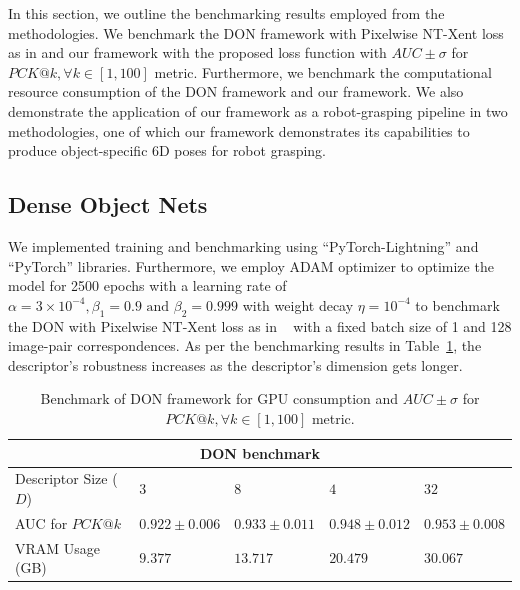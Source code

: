 In this section, we outline the benchmarking results employed from the methodologies.
We benchmark the DON framework with Pixelwise NT-Xent loss as in \cite{adrian2022efficient} and our framework with the
proposed loss function with $AUC \pm \sigma$ for $PCK@k, \forall k \in [1, 100]$ metric.
Furthermore, we benchmark the computational resource consumption of the DON framework and our framework.
We also demonstrate the application of our framework as a robot-grasping pipeline in two methodologies,
one of which our framework demonstrates its capabilities to produce object-specific 6D poses for robot grasping.

\subsection{Dense Object Nets}
We implemented training and benchmarking using ``PyTorch-Lightning''\cite{falcon2019pytorch} and ``PyTorch''\cite{paszke2019pytorch} libraries.
Furthermore, we employ
ADAM\cite{kingma2014adam} optimizer to optimize the model for 2500 epochs with a learning rate of
$\alpha = 3 \times 10^{-4}, \beta_1 = 0.9 \text{ and } \beta_2 = 0.999$ with weight decay $\eta =10^{-4}$ to benchmark the DON with Pixelwise NT-Xent loss as in ~\cite{adrian2022efficient}
with a fixed batch size of 1 and 128 image-pair correspondences.
As per the benchmarking results in Table~\ref{table:don_training_results}, the descriptor's robustness increases as the descriptor's dimension gets longer.

\begin{table}[htb]
    \caption{Benchmark of DON framework for GPU consumption and $AUC \pm \sigma$ for $PCK@k,  \forall k \in [1, 100]$ metric.}
    \label{table:don_training_results}
    \centering
    \begin{tabular}{lllll}
        \toprule
        \multicolumn{5}{c}{DON benchmark}                                                                     \\
        \midrule
        Descriptor Size ($D$) & $3 $              & $8 $              & $4 $              & $32$              \\
        AUC for $PCK@k$       & $0.922 \pm 0.006$ & $0.933 \pm 0.011$ & $0.948 \pm 0.012$ & $0.953 \pm 0.008$ \\
        VRAM Usage (GB)       & $9.377 $          & $13.717 $         & $20.479 $         & $30.067$          \\
        \bottomrule
    \end{tabular}
\end{table}

